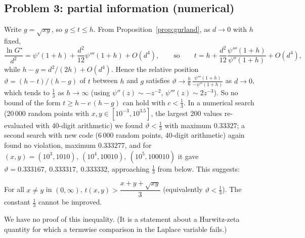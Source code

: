 \subsection{Problem 3: partial information (numerical)}
Write $g=\sqrt{xy}$, so $g\le t\le h$. From Proposition~\ref{prop:gurland}, as $d\to0$ with $h$ fixed,
\[
\frac{\ln G^\star}{d^2}=\psi'(1+h)+\frac{d^2}{12}\psi'''(1+h)+O(d^4),\qquad\text{so}\qquad t=h+\frac{d^2}{12}\frac{\psi'''(1+h)}{\psi''(1+h)}+O(d^4),
\]
while $h-g=d^2/(2h)+O(d^4)$. Hence the relative position $\vartheta=(h-t)/(h-g)$ of $t$ between $h$ and $g$ satisfies $\vartheta\to\frac h6\,\frac{\psi'''(1+h)}{-\psi''(1+h)}$ as $d\to0$, which tends to $\frac13$ as $h\to\infty$ (using $\psi''(z)\sim-z^{-2}$, $\psi'''(z)\sim2z^{-3}$). So no bound of the form $t\ge h-c\,(h-g)$ can hold with $c<\frac13$. In a numerical search (20\,000 random points with $x,y\in[10^{-3},10^{3.5}]$, the largest 200 values re-evaluated with 40-digit arithmetic) we found $\vartheta<\frac13$ with maximum $0.33327$; a second search with new code (6\,000 random points, 40-digit arithmetic) again found no violation, maximum $0.333277$, and for $(x,y)=(10^3,1010),\ (10^4,10010),\ (10^5,100010)$ it gave $\vartheta=0.333167,\ 0.333317,\ 0.333332$, approaching $\frac13$ from below. This suggests:

\begin{conjecture}\label{conj:gurland3}
For all $x\ne y$ in $(0,\infty)$, $t(x,y)>\dfrac{x+y+\sqrt{xy}}3$ (equivalently $\vartheta<\tfrac13$). The constant $\tfrac13$ cannot be improved.
\end{conjecture}
We have no proof of this inequality. (It is a statement about a Hurwitz-zeta quantity for which a termwise comparison in the Laplace variable fails.)
